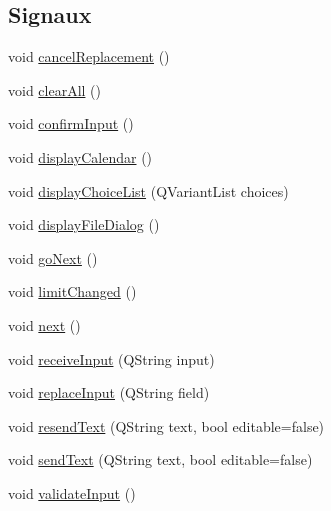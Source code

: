 \subsection*{Signaux}
\begin{DoxyCompactItemize}
\item 
void \hyperlink{classSH__InOutStateMachine_a035d37535533d4805fe2606f38c19380}{cancel\-Replacement} ()
\item 
void \hyperlink{classSH__InOutStateMachine_aa1d5860888c96ff94c55dc77e0fdfdcf}{clear\-All} ()
\item 
void \hyperlink{classSH__InOutStateMachine_a7f7d9c9300c1d05bce2c26029f28cc31}{confirm\-Input} ()
\item 
void \hyperlink{classSH__InOutStateMachine_ab3a12d1f9b658d8ffdc17669a6c065f2}{display\-Calendar} ()
\item 
void \hyperlink{classSH__InOutStateMachine_ab74b981b0aab09067d7479f2b7e79b0b}{display\-Choice\-List} (Q\-Variant\-List choices)
\item 
void \hyperlink{classSH__InOutStateMachine_abd206c3bc32bb7690df9c3e1cd546ebc}{display\-File\-Dialog} ()
\item 
void \hyperlink{classSH__GenericStateMachine_aec37e33524182ab83bf300f1cc1a064e}{go\-Next} ()
\item 
void \hyperlink{classSH__LoopingInOutStateMachine_ab9ce2fc14467ccbfaf9ccb696d90d9df}{limit\-Changed} ()
\item 
void \hyperlink{classSH__GenericStateMachine_af4771d31d87951c997fba1633c2d67f6}{next} ()
\item 
void \hyperlink{classSH__InOutStateMachine_a037ed5e13ecfae2123a8d4940292e410}{receive\-Input} (Q\-String input)
\item 
void \hyperlink{classSH__InOutStateMachine_a9fa5db44086de2576c812f631aa4f60a}{replace\-Input} (Q\-String field)
\item 
void \hyperlink{classSH__InOutStateMachine_a526822c66b46aa0cd81ba4473fa5573f}{resend\-Text} (Q\-String text, bool editable=false)
\item 
void \hyperlink{classSH__InOutStateMachine_a5e7f5958bae31696b6a8deab94ad2b4f}{send\-Text} (Q\-String text, bool editable=false)
\item 
void \hyperlink{classSH__InOutStateMachine_aec1b3fef3c1f82499aa1f73beaecd08a}{validate\-Input} ()
\end{DoxyCompactItemize}
